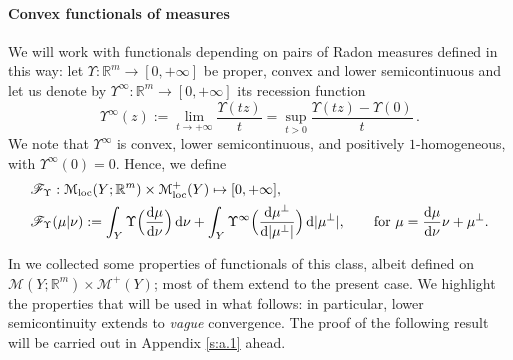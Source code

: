 \documentclass[11pt,reqno]{amsart}
\numberwithin{equation}{section}
\newcommand{\R}{\mathbb{R}}
\newcommand{\calF}{\mathcal{F}}
\newcommand{\calM}{\mathcal{M}}
\newcommand{\dd}{\mathrm{d}}
\theoremstyle{definition}
\def\dd{\mathrm{d}}
\newcommand{\pinfty}{{+\infty}}
\def\calF{\mathscr F}
\newcommand{\Mloc}{\mathcal{M}_{\mathrm{loc}}}
\newcommand{\RNEW}{\color{black}} %
\newcommand{\TODO}[1]{\todo[inline, color=cyan!20]{#1}}
\newcommand{\EEE}{\color{black}}
\numberwithin{equation}{section}
\begin{document}
\paragraph{\bf Convex functionals of measures} We will work with functionals depending on pairs of Radon measures
defined in this way:
let 
$\Upsilon:\R^m\to [0,\pinfty]$ be proper,  convex and lower semicontinuous
and let us denote
by $\Upsilon^\infty:\R^m\to [0,\pinfty]$ its recession function
\begin{equation}
  \label{recession-upsi}
  \Upsilon^\infty(z):=\lim_{t\to\pinfty}\frac{\Upsilon(tz)}t=\sup_{t>0}\frac{\Upsilon(tz)-\Upsilon(0)}t\,.
\end{equation}
We note that $\Upsilon^\infty$ is  convex, lower semicontinuous, and positively $1$-homogeneous,  with $\Upsilon^\infty(0)=0$. Hence, we define  \EEE
\begin{equation}
\label{def:F-F}
\begin{aligned}
&
\calF_\Upsilon:\Mloc(Y;\R^m) \times \Mloc^+(Y)\mapsto [0,\pinfty], \qquad
\\
&
\calF_\Upsilon(\mu|\nu) :=
\int_Y \Upsilon \Bigl(\frac{\dd \mu}{\dd \nu}\Bigr)\,\dd\nu+
\int_Y \Upsilon^\infty\Bigl(\frac{\dd \mu^\perp}{\dd |\mu^\perp|}\Bigr) \,
\dd |\mu^\perp|,\qquad \text{for }\mu=\frac{\dd \mu}{\dd \nu}\nu+\mu^\perp.
\end{aligned}
\end{equation}
\par
In \cite[Lemma 2.3]{PRST22} we collected some properties of functionals of this class, albeit defined on 
$\calM(Y;\R^m) \times \calM^+(Y)$; most of them extend to the present case. We  highlight the properties that will be used in what follows: in particular,
lower semicontinuity extends to \emph{vague} convergence. \RNEW The proof of the following result will be carried out in Appendix \ref{s:a.1} ahead. \EEE
\end{document}
